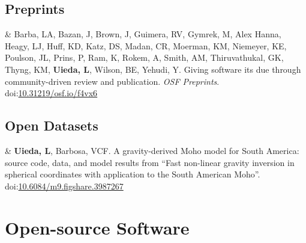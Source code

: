 \documentclass[11pt, a4paper]{article}
\newcommand{\LastName}{Uieda}
\newcommand{\Initials}{L}
\newcommand{\Me}{\textbf{\LastName, \Initials}}  %
\newcommand{\Val}{Barbosa, VCF}
\newcommand{\Lindsey}{Heagy, LJ}
\newcommand{\LBarba}{Barba, LA}
\newcommand{\JBazan}{Bazan, J}
\newcommand{\JBrown}{Brown, J}
\newcommand{\RGuimera}{Guimera, RV}
\newcommand{\MGymrek}{Gymrek, M}
\newcommand{\AHanna}{Alex Hanna}
\newcommand{\KHuff}{Huff, KD}
\newcommand{\DKatz}{Katz, DS}
\newcommand{\CMadan}{Madan, CR}
\newcommand{\KMoerman}{Moerman, KM}
\newcommand{\KNiemeyer}{Niemeyer, KE}
\newcommand{\JPoulson}{Poulson, JL}
\newcommand{\PPrins}{Prins, P}
\newcommand{\KRam}{Ram, K}
\newcommand{\ARokem}{Rokem, A}
\newcommand{\Arfon}{Smith, AM}
\newcommand{\GThiruvathukal}{Thiruvathukal, GK}
\newcommand{\KThyng}{Thyng, KM}
\newcommand{\BWilson}{Wilson, BE}
\newcommand{\Yehudi}{Yehudi, Y}
\newcommand{\DOI}[1]{doi:\href{https://doi.org/#1}{#1}}
\newcommand{\Year}[1]{\fontsize{10pt}{0}\selectfont #1}
\begin{document}
\subsection{Preprints}

\begin{EntriesTable}
\Year{2019}  &
    \LBarba, \JBazan, \JBrown, \RGuimera, \MGymrek, \AHanna, \Lindsey, \KHuff, \DKatz,
    \CMadan, \KMoerman, \KNiemeyer, \JPoulson, \PPrins, \KRam, \ARokem, \Arfon,
    \GThiruvathukal, \KThyng, \Me, \BWilson, \Yehudi.
    Giving software its due through community-driven review and publication.
    \emph{OSF Preprints}.
    \DOI{10.31219/osf.io/f4vx6}
\end{EntriesTable}

\subsection{Open Datasets}

\begin{EntriesTable}
\Year{2017}  &
    \Me, \Val.
    A gravity-derived Moho model for South America: source code, data, and
    model results from ``Fast non-linear gravity inversion in spherical
    coordinates with application to the South American Moho''.
    \DOI{10.6084/m9.figshare.3987267}
\end{EntriesTable}


\section{Open-source Software}
\end{document}
